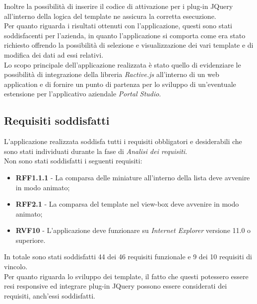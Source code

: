 Inoltre la possibilità di inserire il codice di attivazione per i plug-in JQuery all'interno della logica del template ne assicura la corretta esecuzione.\\
Per quanto riguarda i risultati ottenuti con l'applicazione, questi sono stati soddisfacenti per l'azienda, in quanto l'applicazione si comporta come era stato richiesto offrendo la possibilità di selezione e visualizzazione dei vari template e di modifica dei dati ad essi relativi.\\
Lo scopo principale dell'applicazione realizzata è stato quello di evidenziare le possibilità di integrazione della libreria \textit{Ractive.js} all'interno di un web application e di fornire un punto di partenza per lo sviluppo di un'eventuale estensione per l'applicativo aziendale \textit{Portal Studio}.
 
\subsection{Requisiti soddisfatti}
L'applicazione realizzata soddisfa tutti i requisiti obbligatori e desiderabili che sono stati individuati durante la fase di \textit{Analisi dei requisiti}.\\
Non sono stati soddisfatti i seguenti requisiti:
\begin{itemize}
	\item \textbf{RFF1.1.1} - La comparsa delle miniature all'interno della lista deve avvenire in modo animato;
	\item \textbf{RFF2.1} - La comparsa del template nel view-box deve avvenire in modo animato;
	\item \textbf{RVF10} - L'applicazione deve funzionare su \textit{Internet Explorer} versione 11.0 o superiore.
\end{itemize}
In totale sono stati soddisfatti 44 dei 46 requisiti funzionale e 9 dei 10 requisiti di vincolo.\\
Per quanto riguarda lo sviluppo dei template, il fatto che questi potessero essere resi responsive ed integrare plug-in JQuery possono essere considerati dei requisiti, anch'essi soddisfatti.
